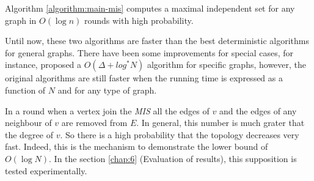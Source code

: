 \begin{theorem}

Algorithm \ref{algorithm:main-mis} computes a maximal independent set for any graph in $O(\log n)$ rounds with high probability.

\end{theorem}


 Until now, these two algorithms are faster than the best deterministic algorithms for general graphs. There have been some improvements for special cases, for instance, \cite{panconesi1996complexity} proposed a $O(\Delta + log^* N)$ algorithm for specific graphs, however, the original algorithms are still faster when the running time is expressed as a function of $N$ and for any type of graph.
 
 In a round when a vertex join the \textit{MIS} all the edges of $v$ and the edges of any neighbour of $v$ are removed from $E$. In general, this number is much grater that the degree of $v$. So there is a high probability that the topology decreases very fast. Indeed, this is the mechanism to demonstrate the lower bound of $O(\log N)$. In the section \ref{chap:6} (Evaluation of results), this supposition is tested experimentally. 
 



\newpage